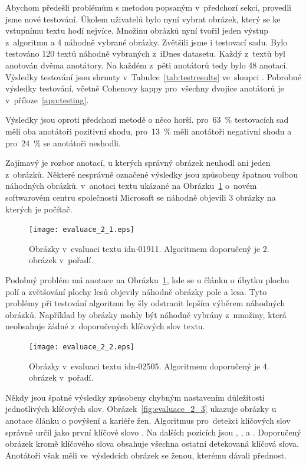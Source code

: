Abychom předešli problémům s metodou popsaným v~předchozí sekci, provedli jsme nové testování. Úkolem uživatelů bylo nyní vybrat obrázek, který se ke vstupnímu textu hodí nejvíce. Množinu obrázků nyní tvořil jeden výstup z~algoritmu a 4 náhodně vybrané obrázky. Zvětšili jsme i testovací sadu. Bylo testováno 120 textů náhodně vybraných z~iDnes datasetu. Každý z~textů byl anotován dvěma anotátory. Na každém z~pěti anotátorů tedy bylo 48 anotací. Výsledky testování jsou shrnuty v~Tabulce~\ref{tab:testresults} ve~sloupci . Pobrobné výsledky testování, včetně Cohenovy kappy pro~všechny dvojice anotátorů je v~příloze~\ref{app:testing}.

Výsledky jsou oproti předchozí metodě o něco horší. pro~63~\% testovacích sad měli oba anotátoři pozitivní shodu, pro~13~\% měli anotátoři negativní shodu a pro~24~\% se anotátoři neshodli.

Zajímavý je rozbor anotací, u kterých správný obrázek neuhodl ani jeden z~obrázků. Některé nesprávně označené výsledky jsou způsobeny špatnou volbou náhodných obrázků. v~anotaci textu  ukázané na Obrázku~\ref{fig:evaluace_2_1} o~novém softwarovém centru společnosti Microsoft se náhodně objevili 3 obrázky na kterých je počítač.

\begin{figure}[h]
  \centering
  \texttt{[image: evaluace\_2\_1.eps]}
  \caption{Obrázky v~evaluaci textu idn-01911. Algoritmem doporučený je 2. obrázek v~pořadí.}
  \label{fig:evaluace_2_1}
\end{figure}


Podobný problém má anotace na Obrázku~\ref{fig:evaluace_2_1}, kde se u článku o úbytku plochu polí a zvětšování plochy lesů objevily náhodně obrázky pole a lesa. Tyto problémy při testování algoritmu by šly odstranit lepším výběrem náhodných obrázků. Například by obrázky mohly být náhodně vybrány z~množiny, která neobsahuje žádné z~doporučených klíčových slov textu.

\begin{figure}[h]
  \centering
  \texttt{[image: evaluace\_2\_2.eps]}
  \caption{Obrázky v~evaluaci textu idn-02505. Algoritmem doporučený je 4. obrázek v~pořadí.}
  \label{fig:evaluace_2_2}
\end{figure}

Někdy jsou špatné výsledky způsobeny chybným nastavením důležitosti jednotlivých klíčových slov. Obrázek~\ref{fig:evaluace_2_3} ukazuje obrázky u anotace článku o povýšení a kariéře žen. Algoritmus pro~detekci klíčových slov správně určil jako první klíčové slovo . Na dalších pozicích jsou , ,  a . Doporučený obrázek kromě klíčového slova  obsahuje všechna ostatní detekovaná klíčová slova. Anotátoři však měli ve~výsledcích obrázek se ženou, kterému dávali přednost.

